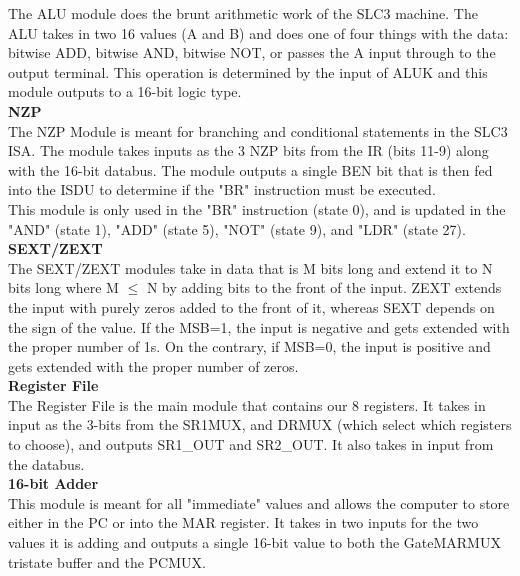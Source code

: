 \documentclass[journal, twocolumn, final,11pt,letterpaper]{IEEEtran}
\begin{document}
The ALU module does the brunt arithmetic work of the SLC3 machine.  The ALU takes in two 16 values (A and B) and does one of four things with the data: bitwise ADD, bitwise AND, bitwise NOT, or passes the A input through to the output terminal. This operation is determined by the input of ALUK and this module outputs to a 16-bit logic type.\\

\normalsize\textbf{NZP} \\

The NZP Module is meant for branching and conditional statements in the SLC3 ISA. The module takes inputs as the 3 NZP bits from the IR (bits 11-9) along with the 16-bit databus. The module outputs a single BEN bit that is then fed into the ISDU to determine if the "BR" instruction must be executed. \\

This module is only used in the "BR" instruction (state 0), and is updated in the "AND" (state 1), "ADD" (state 5), "NOT" (state 9), and "LDR" (state 27). \\


\normalsize\textbf{SEXT/ZEXT} \\

The SEXT/ZEXT modules take in data that is M bits long and extend it to N bits long where M $\le$ N by adding bits to the front of the input.  ZEXT extends the input with purely zeros added to the front of it, whereas SEXT depends on the sign of the value.  If the MSB=1, the input is negative and gets extended with the proper number of 1s.  On the contrary, if MSB=0, the input is positive and gets extended with the proper number of zeros.  \\

\normalsize\textbf{Register File} \\

The Register File is the main module that contains our 8 registers. It takes in input as the 3-bits from the SR1MUX, and DRMUX (which select which registers to choose), and outputs SR1\_OUT and SR2\_OUT. It also takes in input from the databus.\\

\normalsize\textbf{16-bit Adder} \\

This module is meant for all "immediate" values and allows the computer to store either in the PC or into the MAR register. It takes in two inputs for the two values it is adding and outputs a single 16-bit value to both the GateMARMUX tristate buffer and the PCMUX. \\
\end{document}
